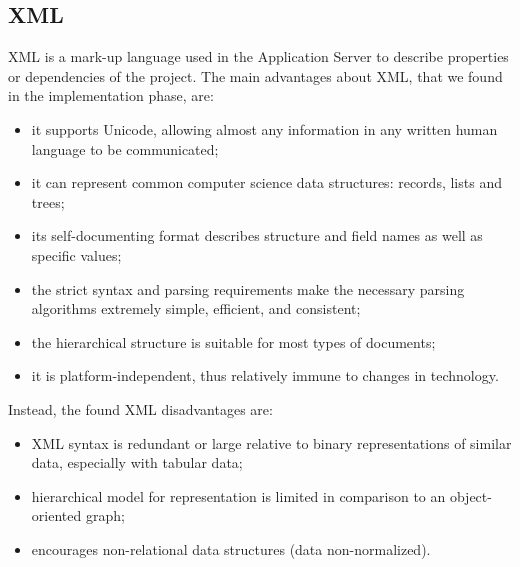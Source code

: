 \subsection{XML}
\label{subsect:XML}
XML is a mark-up language used in the Application Server to describe properties or dependencies of the project. The main advantages about XML, that we found in the implementation phase, are:
\begin{itemize}
\item it supports Unicode, allowing almost any information in any written human language to be communicated;
\item it can represent common computer science data structures: records, lists and trees;
\item its self-documenting format describes structure and field names as well as specific values;
\item the strict syntax and parsing requirements make the necessary parsing algorithms extremely simple, efficient, and consistent;
\item the hierarchical structure is suitable for most types of documents;
\item it is platform-independent, thus relatively immune to changes in technology.
\end{itemize}
Instead, the found XML disadvantages are:
\begin{itemize}
\item XML syntax is redundant or large relative to binary representations of similar data, especially with tabular data;
\item hierarchical model for representation is limited in comparison to an object-oriented graph;
\item encourages non-relational data structures (data non-normalized).
\end{itemize}
